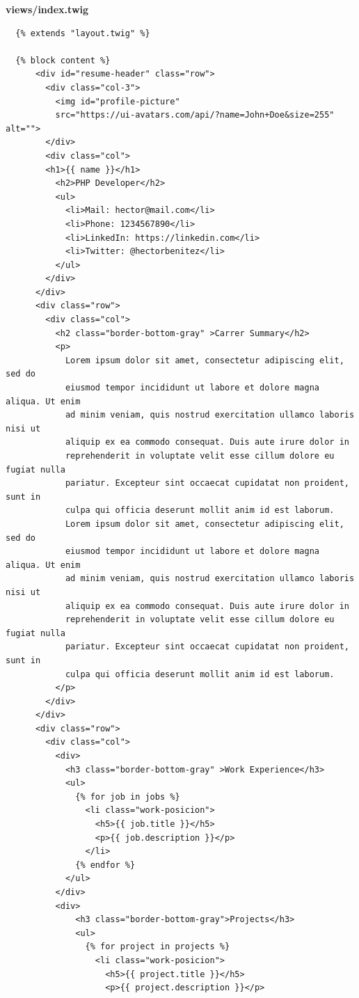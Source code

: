 \documentclass{article}
\begin{document}
\textbf{views/index.twig}
\begin{verbatim}
  {% extends "layout.twig" %}

  {% block content %}
      <div id="resume-header" class="row">
        <div class="col-3">
          <img id="profile-picture"
          src="https://ui-avatars.com/api/?name=John+Doe&size=255" alt="">
        </div>
        <div class="col">
        <h1>{{ name }}</h1>
          <h2>PHP Developer</h2>
          <ul>
            <li>Mail: hector@mail.com</li>
            <li>Phone: 1234567890</li>
            <li>LinkedIn: https://linkedin.com</li>
            <li>Twitter: @hectorbenitez</li>
          </ul>
        </div>
      </div>
      <div class="row">
        <div class="col">
          <h2 class="border-bottom-gray" >Carrer Summary</h2>
          <p>
            Lorem ipsum dolor sit amet, consectetur adipiscing elit, sed do
            eiusmod tempor incididunt ut labore et dolore magna aliqua. Ut enim
            ad minim veniam, quis nostrud exercitation ullamco laboris nisi ut
            aliquip ex ea commodo consequat. Duis aute irure dolor in
            reprehenderit in voluptate velit esse cillum dolore eu fugiat nulla
            pariatur. Excepteur sint occaecat cupidatat non proident, sunt in
            culpa qui officia deserunt mollit anim id est laborum.
            Lorem ipsum dolor sit amet, consectetur adipiscing elit, sed do
            eiusmod tempor incididunt ut labore et dolore magna aliqua. Ut enim
            ad minim veniam, quis nostrud exercitation ullamco laboris nisi ut
            aliquip ex ea commodo consequat. Duis aute irure dolor in
            reprehenderit in voluptate velit esse cillum dolore eu fugiat nulla
            pariatur. Excepteur sint occaecat cupidatat non proident, sunt in
            culpa qui officia deserunt mollit anim id est laborum.
          </p>
        </div>
      </div>
      <div class="row">
        <div class="col">
          <div>
            <h3 class="border-bottom-gray" >Work Experience</h3>
            <ul>
              {% for job in jobs %}
                <li class="work-posicion">
                  <h5>{{ job.title }}</h5>
                  <p>{{ job.description }}</p>
                </li>
              {% endfor %}
            </ul>
          </div>
          <div>
              <h3 class="border-bottom-gray">Projects</h3>
              <ul>
                {% for project in projects %}
                  <li class="work-posicion">
                    <h5>{{ project.title }}</h5>
                    <p>{{ project.description }}</p>

\end{verbatim}
\end{document}
